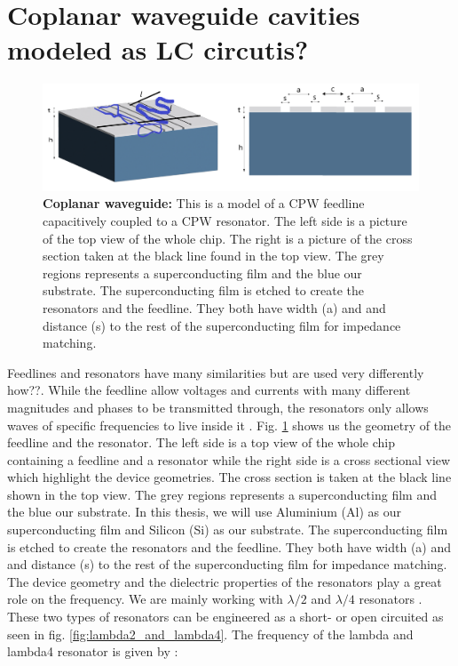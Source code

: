     \section{Coplanar waveguide cavities modeled as LC circutis?}
    \begin{figure} [h]
        \centering
            \includegraphics[width=13cm]{Images/2D_Chip_dim.png}
            \caption[Coplaner waveguide]{\textbf{Coplanar waveguide:} This is a model of a CPW feedline capacitively coupled to a CPW resonator. The left side is a picture of the top view of the whole chip. The right is a picture of the cross section taken at the black line found in the top view. The grey regions represents a superconducting film and the blue our substrate. The superconducting film is etched to create the resonators and the feedline. They both have width (a) and and distance (s) to the rest of the superconducting film for impedance matching.}
        \label{fig:2D_chip_dim}
    \end{figure}
    Feedlines and resonators have many similarities but are used very differently how??. While the feedline allow voltages and currents with many different magnitudes and phases to be transmitted through, the resonators only allows waves of specific frequencies to live inside it \cite{Pozar2012}. Fig. \ref{fig:2D_chip_dim} shows us the geometry of the feedline and the resonator. The left side is a top view of the whole chip containing a feedline and a resonator while the right side is a cross sectional view which highlight the device geometries. The cross section is taken at the black line shown in the top view. The grey regions represents a superconducting film and the blue our substrate. In this thesis, we will use Aluminium (Al) as our superconducting film and Silicon (Si) as our substrate. The superconducting film is etched to create the resonators and the feedline. They both have width (a) and and distance (s) to the rest of the superconducting film for impedance matching. 
    \newline
    \newline
    The device geometry and the dielectric properties of the resonators play a great role on the frequency. We are mainly working with $\lambda / 2$ and $\lambda / 4$ resonators \cite{Pozar2012}.  These two types of resonators can be engineered as a short- or open circuited as seen in fig. \ref{fig:lambda2_and_lambda4}. The frequency of the lambda and lambda4 resonator is given by \cite{Goppl2008}: 
